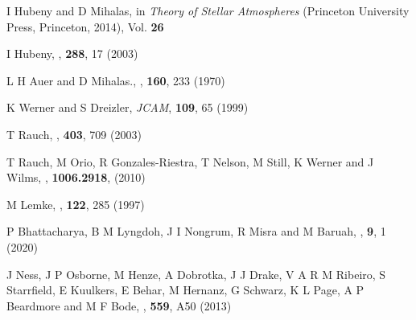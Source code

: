 \begin{thebibliography}{100}

	I  Hubeny and D Mihalas, in \textit{Theory of Stellar Atmospheres} (Princeton University Press, Princeton, 2014), Vol. \textbf{26}
	
	I Hubeny, \textit{\SAM}, \textbf{288}, 17 (2003)
	
	L H Auer and D Mihalas., \textit{\ApJ}, \textbf{160}, 233 (1970)
	
	K Werner and S Dreizler, \textit{JCAM}, \textbf{109}, 65 (1999)
	
	T Rauch, \textit{\AnA}, \textbf{403}, 709 (2003)
	
	T Rauch, M Orio, R Gonzales-Riestra, T Nelson, M Still, K Werner and J Wilms, \textit{\ARX}, \textbf{1006.2918}, (2010)
	
	M Lemke, \textit{\AnASS}, \textbf{122}, 285 (1997)
	
	P Bhattacharya, B M Lyngdoh, J I Nongrum, R Misra and M Baruah, \textit{\AJET}, \textbf{9}, 1 (2020)
	
	J Ness, J P Osborne, M Henze, A Dobrotka, J J Drake, V A R M Ribeiro, S Starrfield, E Kuulkers, E Behar, M Hernanz, G Schwarz, K L Page, A P Beardmore and M F Bode, \textit{\AnA}, \textbf{559}, A50 (2013)
\end{thebibliography}





